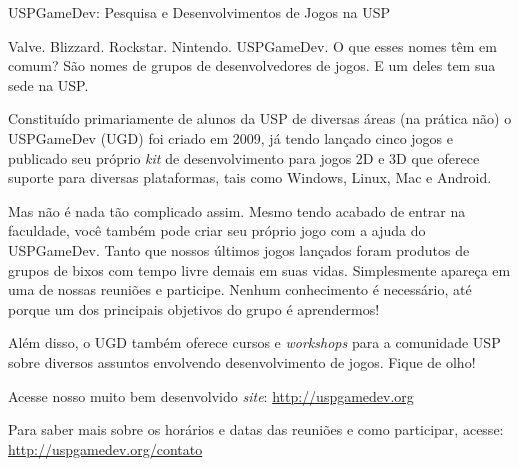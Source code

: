 \begin{subsecao}{USPGameDev: Pesquisa e Desenvolvimentos de Jogos na USP}


Valve. Blizzard. Rockstar. Nintendo. USPGameDev. O que esses nomes têm em comum?
São nomes de grupos de desenvolvedores de jogos. E um deles tem sua sede na USP.

Constituído primariamente de alunos da USP de diversas áreas (na prática não) o 
USPGameDev (UGD) foi criado em 2009, já tendo lançado cinco jogos e 
publicado seu próprio \textit{kit} de desenvolvimento para jogos 2D e 3D que 
oferece suporte para diversas plataformas, tais como Windows, Linux, Mac e Android. 

Mas não é nada tão complicado assim. Mesmo tendo acabado de entrar na faculdade,
você também pode criar seu próprio jogo com a ajuda do USPGameDev. Tanto que nossos
últimos jogos lançados foram produtos de grupos de bixos com tempo livre demais em
suas vidas. Simplesmente apareça em uma de nossas reuniões e participe. Nenhum
conhecimento é necessário, até porque um dos principais objetivos do grupo é
aprendermos!

Além disso, o UGD também oferece cursos e \textit{workshops} para a comunidade USP
sobre diversos assuntos envolvendo desenvolvimento de jogos. Fique de olho!

Acesse nosso muito bem desenvolvido \textit{site}: 
\url{http://uspgamedev.org}

Para saber mais sobre os horários e datas das reuniões e como participar, acesse: 
\url{http://uspgamedev.org/contato}

\end{subsecao}

